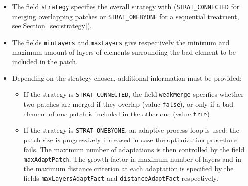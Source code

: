 \documentclass[12pt,a4paper,a4wide]{article}
\begin{document}
\begin{itemize}
\item The field \texttt{strategy} specifies the overall strategy
with (\texttt{STRAT\_CONNECTED} for merging overlapping patches
or \texttt{STRAT\_ONEBYONE} for a sequential treatment, see
Section~\ref{sec:strategy}).
\item The fields \texttt{minLayers} and \texttt{maxLayers} give
respectively the minimum and maximum amount of layers of elements
surrounding the bad element to be included in the patch.
\item Depending on the strategy chosen, additional information
must be provided:
\begin{itemize}
\item If the strategy is \texttt{STRAT\_CONNECTED}, the field
\texttt{weakMerge} specifies whether two patches are merged if
they overlap (value \texttt{false}), or only if a bad element
of one patch is included in the other one (value \texttt{true}).
\item If the strategy is \texttt{STRAT\_ONEBYONE}, an adaptive
process loop is used: the patch size is progressively increased
in case the optimization procedure fails. The maximum number of
adaptations is then controlled by the field \texttt{maxAdaptPatch}.
The growth factor in maximum number of layers and in the maximum
distance criterion at each adaptation is specified by the fields
\texttt{maxLayersAdaptFact} and \texttt{distanceAdaptFact}
respectively.
\end{itemize}
\end{itemize}
\end{document}
